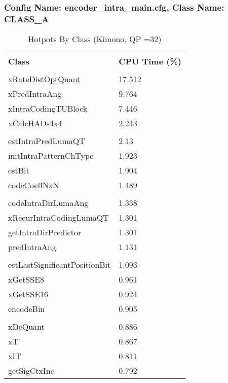 \documentclass{article}%
\begin{document}
\subsubsection{Config Name: encoder\_intra\_main.cfg, Class Name: CLASS\_A}%
\label{ssubsec:ConfigNameencoderintramain.cfg,ClassNameCLASSA}%
\begin{longtabu}{| X[l] | X[l] |}%
\caption{%
Hotpots By Class (Kimono, QP =32)%
}%
\hline%
&\\%
\textbf{Class}&\textbf{CPU Time (\%)}\\%
&\\%
\hline%
\endhead%
xRateDistOptQuant&17.512\\%
\hline%
xPredIntraAng&9.764\\%
\hline%
xIntraCodingTUBlock&7.446\\%
\hline%
xCalcHADs4x4&2.243\\%
\hline%
&\\%
\hline%
estIntraPredLumaQT&2.13\\%
\hline%
initIntraPatternChType&1.923\\%
\hline%
estBit&1.904\\%
\hline%
codeCoeffNxN&1.489\\%
\hline%
&\\%
\hline%
codeIntraDirLumaAng&1.338\\%
\hline%
xRecurIntraCodingLumaQT&1.301\\%
\hline%
getIntraDirPredictor&1.301\\%
\hline%
predIntraAng&1.131\\%
\hline%
&\\%
\hline%
estLastSignificantPositionBit&1.093\\%
\hline%
xGetSSE8&0.961\\%
\hline%
xGetSSE16&0.924\\%
\hline%
encodeBin&0.905\\%
\hline%
&\\%
\hline%
xDeQuant&0.886\\%
\hline%
xT&0.867\\%
\hline%
xIT&0.811\\%
\hline%
getSigCtxInc&0.792\\%
\hline%
\end{longtabu}%
\newpage%
\end{document}
